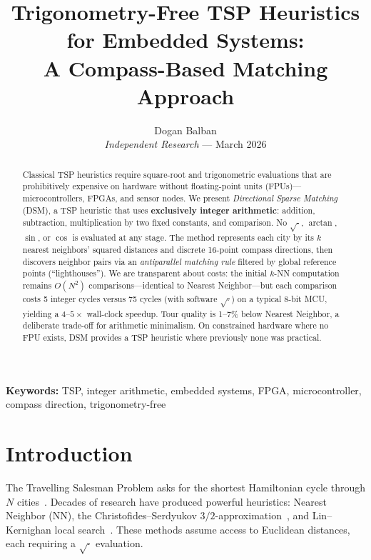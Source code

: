 \documentclass[11pt,a4paper,twocolumn]{article}
\title{\textbf{Trigonometry-Free TSP Heuristics\\for Embedded Systems:\\A Compass-Based Matching Approach}}
\author{Dogan Balban\\[4pt]{\small\textit{Independent Research} --- March 2026}}
\date{}
\begin{document}
\maketitle\thispagestyle{fancy}

\begin{abstract}
\noindent Classical TSP heuristics require square-root and trigonometric evaluations that are prohibitively expensive on hardware without floating-point units (FPUs)---microcontrollers, FPGAs, and sensor nodes. We present \textit{Directional Sparse Matching} (DSM), a TSP heuristic that uses \textbf{exclusively integer arithmetic}: addition, subtraction, multiplication by two fixed constants, and comparison. No $\sqrt{\cdot}$, $\arctan$, $\sin$, or $\cos$ is evaluated at any stage. The method represents each city by its $k$ nearest neighbors' squared distances and discrete 16-point compass directions, then discovers neighbor pairs via an \textit{antiparallel matching rule} filtered by global reference points (``lighthouses''). We are transparent about costs: the initial $k$-NN computation remains $O(N^2)$ comparisons---identical to Nearest Neighbor---but each comparison costs 5 integer cycles versus 75 cycles (with software $\sqrt{\cdot}$) on a typical 8-bit MCU, yielding a $4$--$5\times$ wall-clock speedup. Tour quality is 1--7\% below Nearest Neighbor, a deliberate trade-off for arithmetic minimalism. On constrained hardware where no FPU exists, DSM provides a TSP heuristic where previously none was practical.
\end{abstract}

\smallskip\noindent\textbf{Keywords:} TSP, integer arithmetic, embedded systems, FPGA, microcontroller, compass direction, trigonometry-free

\section{Introduction}\label{sec:intro}

The Travelling Salesman Problem asks for the shortest Hamiltonian cycle through $N$ cities~\cite{applegate2006}. Decades of research have produced powerful heuristics: Nearest Neighbor (NN), the Christofides--Serdyukov $3/2$-approximation~\cite{christofides1976}, and Lin--Kernighan local search~\cite{lin1973}. These methods assume access to Euclidean distances, each requiring a $\sqrt{\cdot}$ evaluation.
\end{document}
